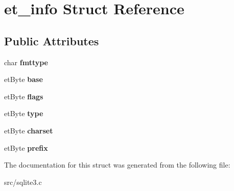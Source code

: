 \hypertarget{structet__info}{\section{et\-\_\-info Struct Reference}
\label{structet__info}
}
\subsection*{Public Attributes}
\begin{DoxyCompactItemize}
\item 
\hypertarget{structet__info_a1740af27f0c9d5840e7dda59a129aa4b}{char {\bfseries fmttype}}\label{structet__info_a1740af27f0c9d5840e7dda59a129aa4b}

\item 
\hypertarget{structet__info_a20f5a4c11c7aa1d9c777805d11965c66}{et\-Byte {\bfseries base}}\label{structet__info_a20f5a4c11c7aa1d9c777805d11965c66}

\item 
\hypertarget{structet__info_a8f11646aaec803f0870683dc3ba2f756}{et\-Byte {\bfseries flags}}\label{structet__info_a8f11646aaec803f0870683dc3ba2f756}

\item 
\hypertarget{structet__info_a148bd1efa49018c9a723701ba5747825}{et\-Byte {\bfseries type}}\label{structet__info_a148bd1efa49018c9a723701ba5747825}

\item 
\hypertarget{structet__info_a77131acb7479b0e6aad61af0901e11c2}{et\-Byte {\bfseries charset}}\label{structet__info_a77131acb7479b0e6aad61af0901e11c2}

\item 
\hypertarget{structet__info_a23cc866bf202c34e49bd49599b051628}{et\-Byte {\bfseries prefix}}\label{structet__info_a23cc866bf202c34e49bd49599b051628}

\end{DoxyCompactItemize}


The documentation for this struct was generated from the following file\-:\begin{DoxyCompactItemize}
\item 
src/sqlite3.\-c\end{DoxyCompactItemize}
